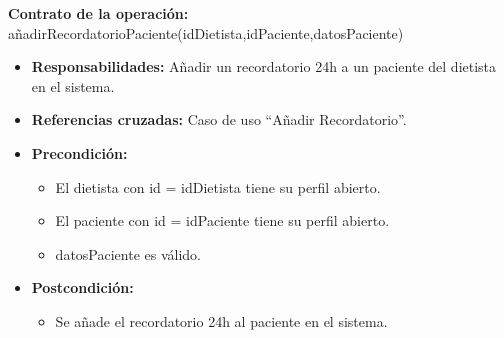 \textbf{Contrato de la operación:} añadirRecordatorioPaciente(idDietista,idPaciente,datosPaciente)
\begin{itemize}
\item \textbf{Responsabilidades:} Añadir un recordatorio 24h a un paciente del dietista en el sistema.
\item \textbf{Referencias cruzadas:} Caso de uso ``Añadir Recordatorio''.
\item \textbf{Precondición:}
\begin{itemize}
\item El dietista con id = idDietista tiene su perfil abierto.
\item El paciente con id = idPaciente tiene su perfil abierto.
\item datosPaciente es válido.
\end{itemize}
\item \textbf{Postcondición:}
\begin{itemize}
\item Se añade el recordatorio 24h al paciente en el sistema.
\end{itemize}
\end{itemize}


